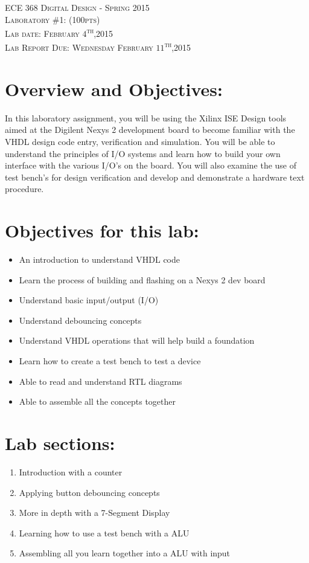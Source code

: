\documentclass{article}
\begin{document}
\begin{center}
\textsc{\huge ECE 368 Digital Design - Spring 2015}\\[1cm]
\textsc{{\LARGE Laboratory \#1: (100pts)}}\\[0.5cm]
\textsc{\Large Lab date: February $4$\textsuperscript{th},2015}\\[0.5cm]
\textsc{\Large Lab Report Due: Wednesday February $11$\textsuperscript{th},2015}\\[1cm]
\end{center}

\section{Overview and Objectives:}
In this laboratory assignment, you will be using the Xilinx ISE Design tools aimed at the Digilent Nexys 2 development board to become familiar with the VHDL design code entry, verification and simulation. You will be able to understand the principles of I/O systems and learn how to build your own interface with the various I/O's on the board. You will also examine the use of test bench's for design verification and develop and demonstrate a hardware text procedure.

\section{Objectives for this lab:}
\begin{itemize}
  \item An introduction to understand VHDL code
  \item Learn the process of building and flashing on a Nexys 2 dev board
  \item Understand basic input/output (I/O)
  \item Understand debouncing concepts
  \item Understand VHDL operations that will help build a foundation
  \item Learn how to create a test bench to test a device
  \item Able to read and understand RTL diagrams
  \item Able to assemble all the concepts together
\end{itemize}

\section{Lab sections:}
\begin{enumerate}
  \item Introduction with a counter
  \item Applying button debouncing concepts
  \item More in depth with a 7-Segment Display
  \item Learning how to use a test bench with a ALU
  \item Assembling all you learn together into a ALU with input
\end{enumerate}
\end{document}
